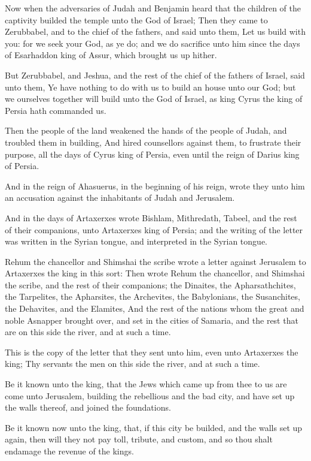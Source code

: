 \Chapter
\Verse Now when the adversaries of Judah and Benjamin heard that the children of the captivity builded the temple unto the \LORD God of Israel; \Verse Then they came to Zerubbabel, and to the chief of the fathers, and said unto them, Let us build with you: for we seek your God, as ye do; and we do sacrifice unto him since the days of Esarhaddon king of Assur, which brought us up hither.

\Verse But Zerubbabel, and Jeshua, and the rest of the chief of the fathers of Israel, said unto them, Ye have nothing to do with us to build an house unto our God; but we ourselves together will build unto the \LORD God of Israel, as king Cyrus the king of Persia hath commanded us.

\Verse Then the people of the land weakened the hands of the people of Judah, and troubled them in building, \Verse And hired counsellors against them, to frustrate their purpose, all the days of Cyrus king of Persia, even until the reign of Darius king of Persia.

\Verse And in the reign of Ahasuerus, in the beginning of his reign, wrote they unto him an accusation against the inhabitants of Judah and Jerusalem.

\Verse And in the days of Artaxerxes wrote Bishlam, Mithredath, Tabeel, and the rest of their companions, unto Artaxerxes king of Persia; and the writing of the letter was written in the Syrian tongue, and interpreted in the Syrian tongue.

\Verse Rehum the chancellor and Shimshai the scribe wrote a letter against Jerusalem to Artaxerxes the king in this sort: \Verse Then wrote Rehum the chancellor, and Shimshai the scribe, and the rest of their companions; the Dinaites, the Apharsathchites, the Tarpelites, the Apharsites, the Archevites, the Babylonians, the Susanchites, the Dehavites, and the Elamites, \Verse And the rest of the nations whom the great and noble Asnapper brought over, and set in the cities of Samaria, and the rest that are on this side the river, and at such a time.

\Verse This is the copy of the letter that they sent unto him, even unto Artaxerxes the king; Thy servants the men on this side the river, and at such a time.

\Verse Be it known unto the king, that the Jews which came up from thee to us are come unto Jerusalem, building the rebellious and the bad city, and have set up the walls thereof, and joined the foundations.

\Verse Be it known now unto the king, that, if this city be builded, and the walls set up again, then will they not pay toll, tribute, and custom, and so thou shalt endamage the revenue of the kings.

